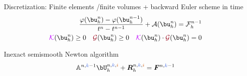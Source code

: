 \begin{frame}
\begin{itemize}
{}
 {
\item Discretization: Finite elements /finite volumes + backward Euler scheme in time
\begin{equation*}
\begin{split}
\frac{\varphi(\bu_h^n)-\varphi(\bu_h^{n-1})}{t^{n}-t^{n-1}} + \mathcal{A}(\bu_h^{n})=\mathcal{F}_h^{n-1}\\
\textcolor{electricpurple}{\mathcal{K}}(\bu_h^{n}) \geq 0 \quad \textcolor{carmine}{\mathcal{G}}(\bu_h^{n}) \geq 0 \quad \textcolor{electricpurple}{\mathcal{K}}(\bu_h^{n}) \cdot \textcolor{carmine}{\mathcal{G}}(\bu_h^{n})=0
\end{split}
\end{equation*}

\item  Inexact semismooth Newton algorithm
\begin{equation*}
\mathbb{A}^{n,\kk-1} \bU_h^{n,\kk,\ii} + {\bm R}_h^{n,\kk,\ii} = {\bm F}^{n,\kk-1}
\end{equation*}
}
\end{itemize}
\end{frame}


